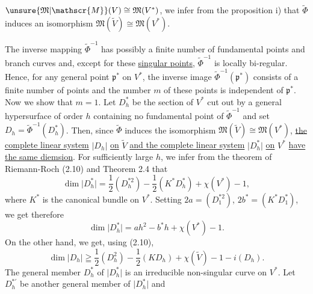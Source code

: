 $\unsure{\mathfrak{M}|\mathscr{M}}(V)\cong\mathfrak{M}(V^{*})$, we infer from the proposition i) that $\widetilde{\Phi}$ induces an isomorphism $\mathfrak{M}(\widetilde{V})\cong\mathfrak{M}(V^{*})$.

The inverse mapping $\widetilde{\Phi}^{-1}$ has possibly a finite number of fundamental points and branch curves and, except for these \uline{singular points}, $\widetilde{\Phi}^{-1}$ is locally bi-regular. Hence, for any general point $\mathfrak{p}^{*}$ on $V^{*}$, the inverse image $\widetilde{\Phi}^{-1}(\mathfrak{p}^{*})$ consists of a finite number of points and the number $m$ of these points is independent of $\mathfrak{p}^{*}$. Now we show that $m=1$. Let $D_h^{*}$ be the section of $V^{*}$ cut out by a general hypersurface of order $h$ containing no fundamental point of $\widetilde{\Phi}^{-1}$ and set $D_h=\widetilde{\Phi}^{-1}(D_h^{*})$. Then, since $\widetilde{\Phi}$ induces the isomorphism $\mathfrak{M}(\widetilde{V})\cong\mathfrak{M}(V^{*})$, \uline{the complete linear system} $\lvert D_h\rvert$ \uline{on} $\widetilde{V}$ \uline{and the complete linear system} $\lvert D_h^{*}\rvert$ \uline{on} $V^{*}$ \uline{have the same diemsion}. For sufficiently large $h$, we infer from the theorem of Riemann-Roch (2.10) and Theorem 2.4 that
\[
\dim\lvert D_h^{*}\rvert=\frac{1}{2}(D_h^{*2})-\frac{1}{2}(K^{*}D_h^{*})+\chi(V^{*})-1,
\]
where $K^{*}$ is the canonical bundle on $V^{*}$. Setting $2a=(D_1^{*2})$, $2b^{*}=(K^{*}D_1^{*})$, we get therefore
\[
\dim\lvert D_h^{*}\rvert=ah^2-b^{*}h+\chi(V^{*})-1.
\]
On the other hand, we get, using (2.10),
\[
\dim\lvert D_h\rvert\geqq\frac{1}{2}(D_h^{2})-\frac{1}{2}(KD_h)+\chi(\widetilde{V})-1-i(D_h).
\]
The general member $D_h^{*}$ of $\lvert D_h^{*}\rvert$ is an irreducible non-singular curve on $V^{*}$. Let $D_h^{*\prime}$ be another general member of $\lvert D_h^{*}\rvert$ and

